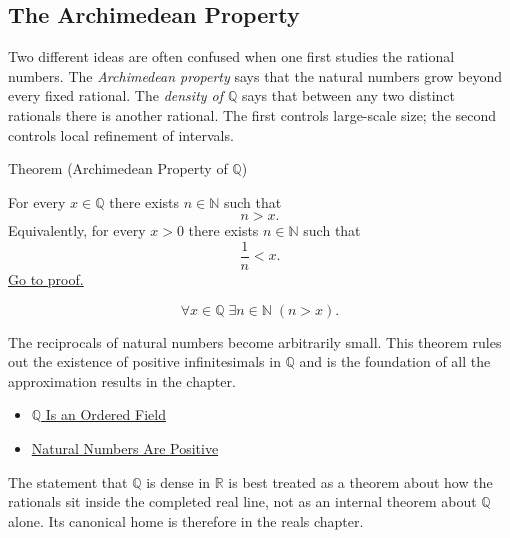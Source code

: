
\subsection*{The Archimedean Property}
\label{sec:density-q}

\begin{exposition}
Two different ideas are often confused when one first studies the rational numbers.
The \emph{Archimedean property} says that the natural numbers grow beyond every
fixed rational. The \emph{density of $\mathbb{Q}$} says that between any two
distinct rationals there is another rational. The first controls large-scale
size; the second controls local refinement of intervals.
\end{exposition}

\begin{theorembox}{Theorem (Archimedean Property of $\mathbb{Q}$)}
\begin{theorem}
\label{thm:archimedean-q}
For every $x\in\mathbb{Q}$ there exists $n\in\mathbb{N}$ such that
\[
n>x.
\]
Equivalently, for every $x>0$ there exists $n\in\mathbb{N}$ such that
\[
\frac{1}{n}<x.
\]
\hyperref[prf:archimedean-q]{Go to proof.}
\end{theorem}
\end{theorembox}

\begin{remark*}
\[
\forall x\in\mathbb{Q}\;\exists n\in\mathbb{N}\;(n>x).
\]
\end{remark*}

\begin{remark*}[Interpretation]
The reciprocals of natural numbers become arbitrarily small. This theorem
rules out the existence of positive infinitesimals in $\mathbb{Q}$ and is the
foundation of all the approximation results in the chapter.
\end{remark*}

\begin{dependencies}
\begin{itemize}
  \item \hyperref[thm:q-is-ordered-field]{$\mathbb{Q}$ Is an Ordered Field}
  \item \hyperref[cor:n-positive]{Natural Numbers Are Positive}
\end{itemize}
\end{dependencies}

\begin{remark*}
The statement that $\mathbb{Q}$ is dense in $\mathbb{R}$ is best treated as a
theorem about how the rationals sit inside the completed real line, not as an
internal theorem about $\mathbb{Q}$ alone. Its canonical home is therefore in
the reals chapter.
\end{remark*}

